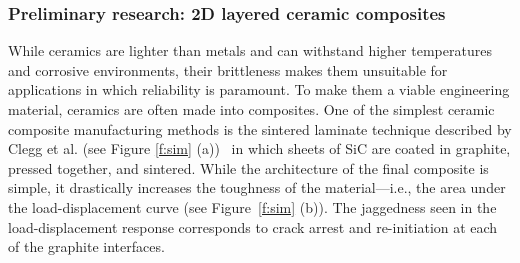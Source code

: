 \documentclass[10pt,letterpaper]{article}
\begin{document}
    \subsubsection{Preliminary research: 2D layered ceramic composites}

      While ceramics are lighter than metals and can withstand higher temperatures and corrosive environments, their brittleness makes them unsuitable for applications in which reliability is paramount. To make them a viable engineering material, ceramics are often made into composites. One of the simplest ceramic composite manufacturing methods is the sintered laminate technique described by Clegg et al. (see Figure \ref{f:sim} (a))~\cite{clegg1990simple} in which sheets of SiC are coated in graphite, pressed together, and sintered. While the architecture of the final composite is simple, it drastically increases the toughness of the material---i.e., the area under the load-displacement curve (see Figure~\ref{f:sim} (b)). The jaggedness seen in the load-displacement response corresponds to crack arrest and re-initiation at each of the graphite interfaces.
\end{document}
